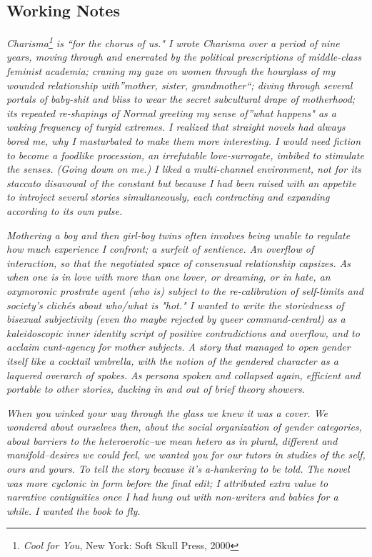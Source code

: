 \documentclass[
]{memoir}
\begin{document}
\hypertarget{working-notes-1}{%
\subsection*{Working Notes}\label{working-notes-1}}

\emph{Charisma\footnote{\emph{Cool for You}, New York: Soft Skull Press,
  2000} is ``for the chorus of us." I wrote Charisma over a period of
nine years, moving through and enervated by the political prescriptions
of middle-class feminist academia; craning my gaze on women through the
hourglass of my wounded relationship with''mother, sister,
grandmother``; diving through several portals of baby-shit and bliss to
wear the secret subcultural drape of motherhood; its repeated
re-shapings of Normal greeting my sense of''what happens" as a waking
frequency of turgid extremes. I realized that straight novels had always
bored me, why I masturbated to make them more interesting. I would need
fiction to become a foodlike procession, an irrefutable love-surrogate,
imbibed to stimulate the senses. (Going down on me.) I liked a
multi-channel environment, not for its staccato disavowal of the
constant but because I had been raised with an appetite to introject
several stories simultaneously, each contracting and expanding according
to its own pulse.}

\emph{Mothering a boy and then girl-boy twins often involves being
unable to regulate how much experience I confront; a surfeit of
sentience. An overflow of interaction, so that the negotiated space of
consensual relationship capsizes. As when one is in love with more than
one lover, or dreaming, or in hate, an oxymoronic prostrate agent (who
is) subject to the re-calibration of self-limits and society's clichés
about who/what is "hot." I wanted to write the storiedness of bisexual
subjectivity (even tho maybe rejected by queer command-central) as a
kaleidoscopic inner identity script of positive contradictions and
overflow, and to acclaim cunt-agency for mother subjects. A story that
managed to open gender itself like a cocktail umbrella, with the notion
of the gendered character as a laquered overarch of spokes. As persona
spoken and collapsed again, efficient and portable to other stories,
ducking in and out of brief theory showers.}

\emph{When you winked your way through the glass we knew it was a cover.
We wondered about ourselves then, about the social organization of
gender categories, about barriers to the heteroerotic--we mean hetero as
in plural, different and manifold--desires we could feel, we wanted you
for our tutors in studies of the self, ours and yours. To tell the story
because it's a-hankering to be told. The novel was more cyclonic in form
before the final edit; I attributed extra value to narrative
contiguities once I had hung out with non-writers and babies for a
while. I wanted the book to fly.}
\end{document}
